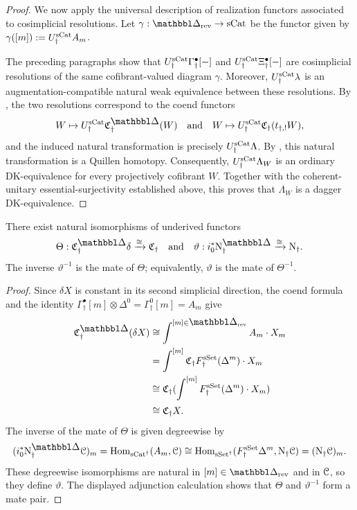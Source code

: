 \documentclass[a4paper,dvipdfmx,11pt]{amsart}
\begin{document}
\begin{proof}
  We now apply the universal description of realization functors associated to cosimplicial resolutions.
  Let $\gamma:\prism_{\rev}\to\sCat$ be the functor given by $\gamma([m]):=U_{\dag}^{\mathrm{sCat}} A_m$.

  The preceding paragraphs show that $U_{\dag}^{\mathrm{sCat}}\Gamma^\bullet_{\dag}[-]$ and $U_{\dag}^{\mathrm{sCat}}\Xi^\bullet_{\dag}[-]$ are cosimplicial resolutions of the same cofibrant-valued diagram $\gamma$.
  Moreover,
  $U_{\dag}^{\mathrm{sCat}}\lambda$ is an augmentation-compatible natural weak equivalence between these resolutions.
  By \cite[Proposition~3.4 and \S9.5]{DugUHT01}, the two resolutions correspond to the coend functors
  \begin{align}
    W \mapsto \UdagSCat\frakC^{\prism}_{\dag}(W)
    \quad \text{and} \quad 
    W \mapsto \UdagSCat\frakC_{\dag}(t_{\dag,!}W),
  \end{align}
  and the induced natural transformation is precisely $U_{\dag}^{\mathrm{sCat}}\Lambda$.
  By \cite[the proof of Lemma~9.7]{DugUHT01}, this natural transformation is a Quillen homotopy.
  Consequently, $U_{\dag}^{\mathrm{sCat}}\Lambda_W$ is an ordinary DK-equivalence for every projectively cofibrant $W$.
  Together with the coherent-unitary essential-surjectivity established above, this proves that $\Lambda_W$ is a dagger DK-equivalence.
\end{proof}

\begin{lemma}\label{jt.lem.transport}
  There exist natural isomorphisms of underived functors
  \begin{align}
    \Theta:\frakC^{\prism}_{\dag}\delta
    \xrightarrow{\cong}\frakC_{\dag}
    \quad\text{and}\quad
    \vartheta:
    i_0^*\N^{\prism}_{\dag}
    \xrightarrow{\cong}
    \N_{\dag}.
  \end{align}
  The inverse $\vartheta^{-1}$ is the mate of $\Theta$;
  equivalently, $\vartheta$ is the mate of $\Theta^{-1}$.
\end{lemma}

\begin{proof}
  Since $\delta X$ is constant in its second simplicial direction, the coend formula and the identity $\Gamma^{\bullet}_{\dag}[m]\otimes\Delta^0=\Gamma^0_{\dag}[m]=A_m$ give
  \begin{align}
    \frakC^{\prism}_{\dag}(\delta X)
    &\cong \int^{[m]\in\prism_{\rev}} A_m\cdot X_m \\
    &= \int^{[m]}\frakC_{\dag}\FdagSSet(\Delta^m)\cdot X_m \\
    &\cong \frakC_{\dag}(\int^{[m]}\FdagSSet(\Delta^m)\cdot X_m) \\
    &\cong \frakC_{\dag}X.
  \end{align}
  The inverse of the mate of $\Theta$ is given degreewise by
  \begin{align}
    (i_0^*\N^{\prism}_{\dag}\calC)_m
    =\Hom_{\sCat^{\dag}}(A_m,\calC)
    \cong\Hom_{\sSet^{\dag}}(\FdagSSet\Delta^m,\N_{\dag}\calC)
    =(\N_{\dag}\calC)_m.
  \end{align}
  These degreewise isomorphisms are natural in $[m]\in\prism_{\rev}$ and in $\mathcal{C}$, so they define $\vartheta$.
  The displayed adjunction calculation shows that $\Theta$ and $\vartheta^{-1}$ form a mate pair.
\end{proof}
\end{document}
